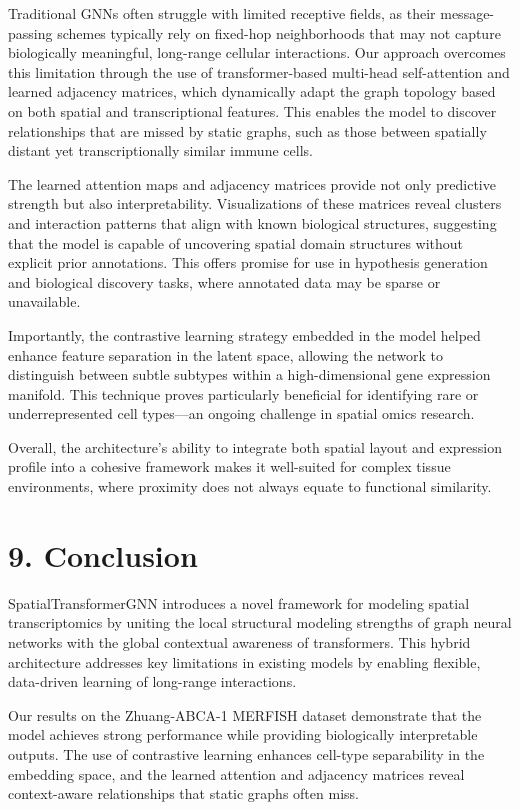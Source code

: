 \documentclass[unnumsec,webpdf,contemporary,medium]{oup-authoring-template}
\begin{document}
Traditional GNNs often struggle with limited receptive fields, as their message-passing schemes typically rely on fixed-hop neighborhoods that may not capture biologically meaningful, long-range cellular interactions. Our approach overcomes this limitation through the use of transformer-based multi-head self-attention and learned adjacency matrices, which dynamically adapt the graph topology based on both spatial and transcriptional features. This enables the model to discover relationships that are missed by static graphs, such as those between spatially distant yet transcriptionally similar immune cells.

The learned attention maps and adjacency matrices provide not only predictive strength but also interpretability. Visualizations of these matrices reveal clusters and interaction patterns that align with known biological structures, suggesting that the model is capable of uncovering spatial domain structures without explicit prior annotations. This offers promise for use in hypothesis generation and biological discovery tasks, where annotated data may be sparse or unavailable.

Importantly, the contrastive learning strategy embedded in the model helped enhance feature separation in the latent space, allowing the network to distinguish between subtle subtypes within a high-dimensional gene expression manifold. This technique proves particularly beneficial for identifying rare or underrepresented cell types—an ongoing challenge in spatial omics research.

Overall, the architecture's ability to integrate both spatial layout and expression profile into a cohesive framework makes it well-suited for complex tissue environments, where proximity does not always equate to functional similarity.

\section*{9. Conclusion}

SpatialTransformerGNN introduces a novel framework for modeling spatial transcriptomics by uniting the local structural modeling strengths of graph neural networks with the global contextual awareness of transformers. This hybrid architecture addresses key limitations in existing models by enabling flexible, data-driven learning of long-range interactions.

Our results on the Zhuang-ABCA-1 MERFISH dataset demonstrate that the model achieves strong performance while providing biologically interpretable outputs. The use of contrastive learning enhances cell-type separability in the embedding space, and the learned attention and adjacency matrices reveal context-aware relationships that static graphs often miss.
\end{document}
